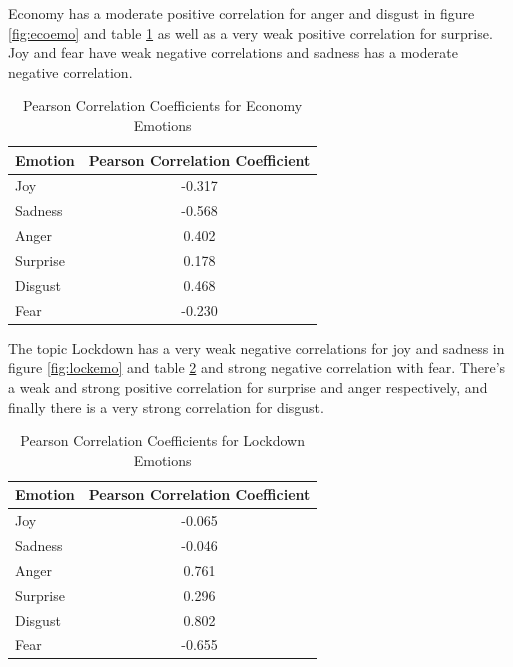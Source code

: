 \documentclass{l4proj}
\begin{document}
Economy has a moderate positive correlation for anger and disgust in figure \ref{fig:ecoemo} and table \ref{tab:ecoemo} as well as a very weak positive correlation for surprise. Joy and fear have weak negative correlations and sadness has a moderate negative correlation.

\begin{table}[h]
\begin{minipage}[c]{\linewidth}
\centering
\begin{tabular}{@{}lc@{}}
\toprule
Emotion  & \multicolumn{1}{l}{Pearson Correlation Coefficient} \\ \midrule
Joy      & -0.317                                              \\
Sadness  & -0.568                                              \\
Anger    & 0.402                                               \\
Surprise & 0.178                                               \\
Disgust  & 0.468                                               \\
Fear     & -0.230                                              \\ \bottomrule
\end{tabular}
\caption{Pearson Correlation Coefficients for Economy Emotions}
\label{tab:ecoemo}
\end{minipage}\hfill

\end{table}

The topic Lockdown has a very weak negative correlations for joy and sadness in figure \ref{fig:lockemo} and table \ref{tab:lockemo} and strong negative correlation with fear. There's a weak and strong positive correlation for surprise and anger respectively, and finally there is a very strong correlation for disgust.

\begin{table}[h]
\begin{minipage}[c]{\linewidth}
\centering
\begin{tabular}{@{}lc@{}}
\toprule
Emotion  & \multicolumn{1}{l}{Pearson Correlation Coefficient} \\ \midrule
Joy      & -0.065                                              \\
Sadness  & -0.046                                              \\
Anger    & 0.761                                               \\
Surprise & 0.296                                               \\
Disgust  & 0.802                                               \\
Fear     & -0.655                                              \\ \bottomrule
\end{tabular}
\caption{Pearson Correlation Coefficients for Lockdown Emotions}
\label{tab:lockemo}
\end{minipage}\hfill

\end{table}
\end{document}
